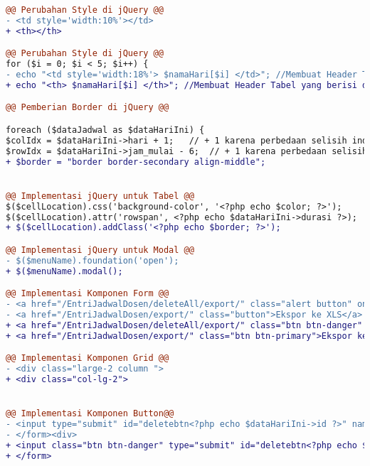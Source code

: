 \begin{lstlisting}[language=diff, caption=Kode untuk Halaman Entri Jadwal Dosen, label=Entri, basicstyle=\ttfamily, frame=single,
columns=fullflexible, keepspaces=true, breaklines=true]
@@ Perubahan Style di jQuery @@
- <td style='width:10%'></td>
+ <th></th>

@@ Perubahan Style di jQuery @@
for ($i = 0; $i < 5; $i++) {
- echo "<td style='width:18%'> $namaHari[$i] </td>"; //Membuat Header Tabel yang berisi daftar hari
+ echo "<th> $namaHari[$i] </th>"; //Membuat Header Tabel yang berisi daftar hari

@@ Pemberian Border di jQuery @@

foreach ($dataJadwal as $dataHariIni) {
$colIdx = $dataHariIni->hari + 1;   // + 1 karena perbedaan selisih index tabel dan value hari di database 
$rowIdx = $dataHariIni->jam_mulai - 6;  // + 1 karena perbedaan selisih index tabel dan value jam_mulai di database 
+ $border = "border border-secondary align-middle";


@@ Implementasi jQuery untuk Tabel @@
$($cellLocation).css('background-color', '<?php echo $color; ?>');
$($cellLocation).attr('rowspan', <?php echo $dataHariIni->durasi ?>);
+ $($cellLocation).addClass('<?php echo $border; ?>');

@@ Implementasi jQuery untuk Modal @@
- $($menuName).foundation('open');
+ $($menuName).modal();

@@ Implementasi Komponen Form @@
- <a href="/EntriJadwalDosen/deleteAll/export/" class="alert button" onClick="return konfirmasi();">Delete All</a>
- <a href="/EntriJadwalDosen/export/" class="button">Ekspor ke XLS</a>
+ <a href="/EntriJadwalDosen/deleteAll/export/" class="btn btn-danger" onClick="return konfirmasi();">Delete All</a>
+ <a href="/EntriJadwalDosen/export/" class="btn btn-primary">Ekspor ke XLS</a>

@@ Implementasi Komponen Grid @@
- <div class="large-2 column ">
+ <div class="col-lg-2">


@@ Implementasi Komponen Button@@
- <input type="submit" id="deletebtn<?php echo $dataHariIni->id ?>" name="deletebtn<?php echo $dataHariIni->id ?>" class="alert button" value="Delete">
- </form><div>
+ <input class="btn btn-danger" type="submit" id="deletebtn<?php echo $dataHariIni->id ?>" name="deletebtn<?php echo $dataHariIni->id ?>" value="Delete">
+ </form>
\end{lstlisting}

